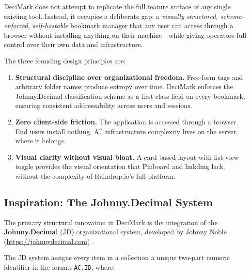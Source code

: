 \documentclass[11pt,a4paper]{book}
\begin{document}
DeciMark does not attempt to replicate the full feature surface of any single existing tool. Instead, it occupies a deliberate gap: a \textit{visually structured, schema-enforced, self-hostable} bookmark manager that any user can access through a browser without installing anything on their machine---while giving operators full control over their own data and infrastructure.

The three founding design principles are:

\begin{enumerate}
  \item \textbf{Structural discipline over organizational freedom.} Free-form tags and arbitrary folder names produce entropy over time. DeciMark enforces the Johnny.Decimal classification scheme as a first-class field on every bookmark, ensuring consistent addressability across users and sessions.
  \item \textbf{Zero client-side friction.} The application is accessed through a browser. End users install nothing. All infrastructure complexity lives on the server, where it belongs.
  \item \textbf{Visual clarity without visual bloat.} A card-based layout with list-view toggle provides the visual orientation that Pinboard and linkding lack, without the complexity of Raindrop.io's full platform.
\end{enumerate}

\subsection{Inspiration: The Johnny.Decimal System}

The primary structural innovation in DeciMark is the integration of the \textbf{Johnny.Decimal} (JD) organizational system, developed by Johnny Noble (\url{https://johnnydecimal.com}) \citep{johnnydecimal2021}.

The JD system assigns every item in a collection a unique two-part numeric identifier in the format \texttt{AC.ID}, where:
\end{document}
